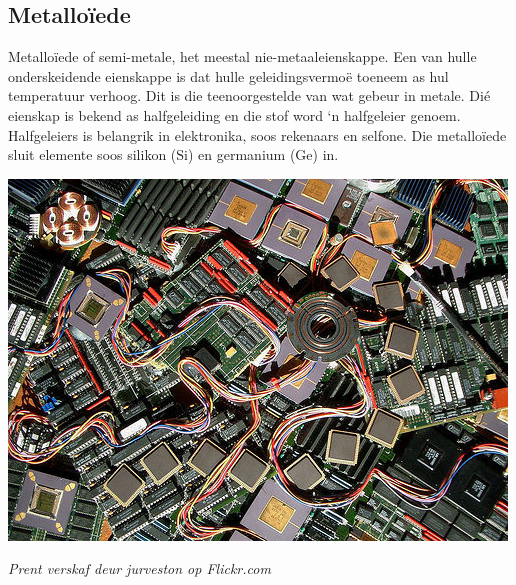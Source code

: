             \subsection*{Metallo\"iede}
            \nopagebreak
\begin{minipage}{.5\textwidth}
        \label{m38708*id66042}Metalloïede of semi-metale, het meestal nie-metaaleienskappe. Een van hulle onderskeidende eienskappe is dat hulle geleidingsvermoë toeneem as hul temperatuur verhoog. Dit is die teenoorgestelde van wat gebeur in metale.  Di\'e eienskap is bekend as halfgeleiding en die stof word ‘n halfgeleier genoem. Halfgeleiers is belangrik in elektronika, soos rekenaars en selfone. Die metallo\"iede sluit elemente soos silikon ($\text{Si}$) en germanium ($\text{Ge}$) in.\par 
\end{minipage}
\begin{minipage}{.5\textwidth}
\begin{center}
 \includegraphics[width=.6\textwidth]{photos/siliconby-jurveston.jpg}\par
\textit{Prent verskaf deur jurveston op Flickr.com}
\end{center}
\end{minipage}
\par \label{m38708*eip-586}\vspace{.5cm} 
      \noindent
